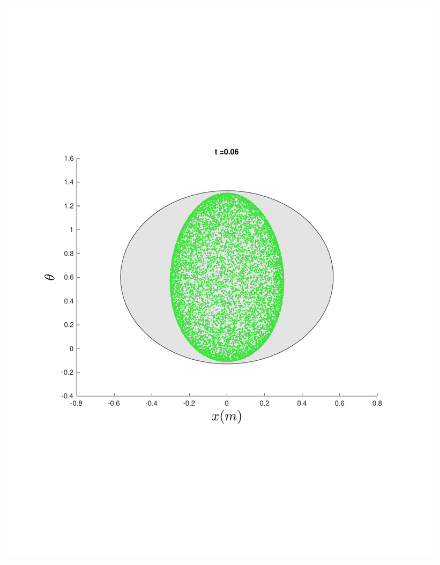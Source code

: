 \begin{figure}
{\begin{minipage}{0.5\textwidth}
\begin{minipage}[b]{0.5\textwidth}
        \includegraphics[width=\textwidth]{figures/method/FunnelSimOverlaid9funnel-1y-theta}
      \end{minipage}%
      \\
      \begin{minipage}[b]{0.5\textwidth}

\end{minipage}
\end{minipage}}
\end{figure}
